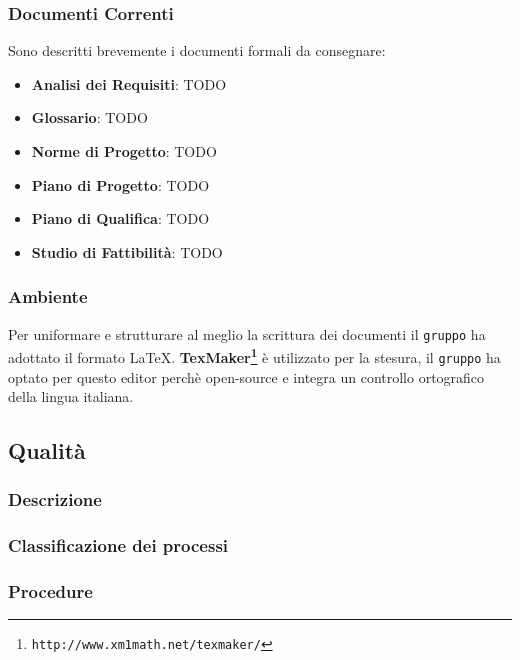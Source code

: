 \subsubsection{Documenti Correnti}
Sono descritti brevemente i documenti formali da consegnare:
\begin{itemize}
	\item \textbf{Analisi dei Requisiti}: TODO
	\item \textbf{Glossario}: TODO
	\item \textbf{Norme di Progetto}: TODO
	\item \textbf{Piano di Progetto}: TODO
	\item \textbf{Piano di Qualifica}: TODO
	\item \textbf{Studio di Fattibilità}: TODO
\end{itemize}

\subsubsection{Ambiente}
Per uniformare e strutturare al meglio la scrittura dei documenti il \texttt{gruppo} ha adottato il formato \LaTeX. 
\newline \textbf{TexMaker\footnote{\texttt{http://www.xm1math.net/texmaker/}}} è utilizzato per la stesura, il \texttt{gruppo} ha optato per questo editor perchè open-source e integra un controllo ortografico della lingua italiana.

\subsection{Qualità}

\subsubsection{Descrizione}

\subsubsection{Classificazione dei processi}

\subsubsection{Procedure}


